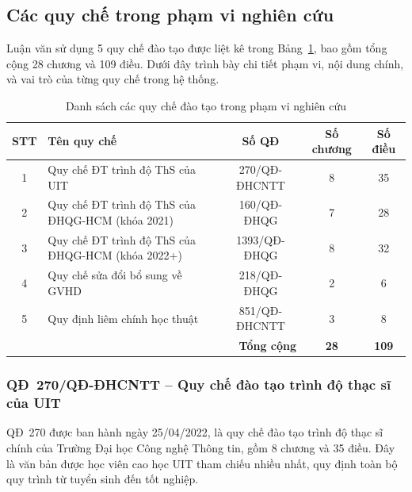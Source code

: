 \subsection{Các quy chế trong phạm vi nghiên cứu}
\label{subsec:cacquiche}

Luận văn sử dụng 5 quy chế đào tạo được liệt kê trong Bảng~\ref{tab:quyche_list},
bao gồm tổng cộng 28 chương và 109 điều. Dưới đây trình bày chi tiết phạm vi,
nội dung chính, và vai trò của từng quy chế trong hệ thống.

\begin{table}[htbp]
    \centering
    \caption{Danh sách các quy chế đào tạo trong phạm vi nghiên cứu}
    \label{tab:quyche_list}
    \begin{tabular}{cp{5.5cm}ccc}
        \toprule
        \textbf{STT} & \textbf{Tên quy chế} & \textbf{Số QĐ} & \textbf{Số chương} & \textbf{Số điều} \\
        \midrule
        1 & Quy chế ĐT trình độ ThS của UIT
          & 270/QĐ-ĐHCNTT & 8 & 35 \\
        2 & Quy chế ĐT trình độ ThS của ĐHQG-HCM (khóa 2021)
          & 160/QĐ-ĐHQG & 7 & 28 \\
        3 & Quy chế ĐT trình độ ThS của ĐHQG-HCM (khóa 2022+)
          & 1393/QĐ-ĐHQG & 8 & 32 \\
        4 & Quy chế sửa đổi bổ sung về GVHD
          & 218/QĐ-ĐHQG & 2 & 6 \\
        5 & Quy định liêm chính học thuật
          & 851/QĐ-ĐHCNTT & 3 & 8 \\
        \midrule
        \multicolumn{3}{r}{\textbf{Tổng cộng}} & \textbf{28} & \textbf{109} \\
        \bottomrule
    \end{tabular}
\end{table}

\subsubsection*{QĐ~270/QĐ-ĐHCNTT -- Quy chế đào tạo trình độ thạc sĩ của UIT}

QĐ~270 được ban hành ngày 25/04/2022, là quy chế đào tạo trình độ thạc sĩ chính
của Trường Đại học Công nghệ Thông tin, gồm 8 chương và 35 điều. Đây là văn bản
được học viên cao học UIT tham chiếu nhiều nhất, quy định toàn bộ quy trình từ
tuyển sinh đến tốt nghiệp.

